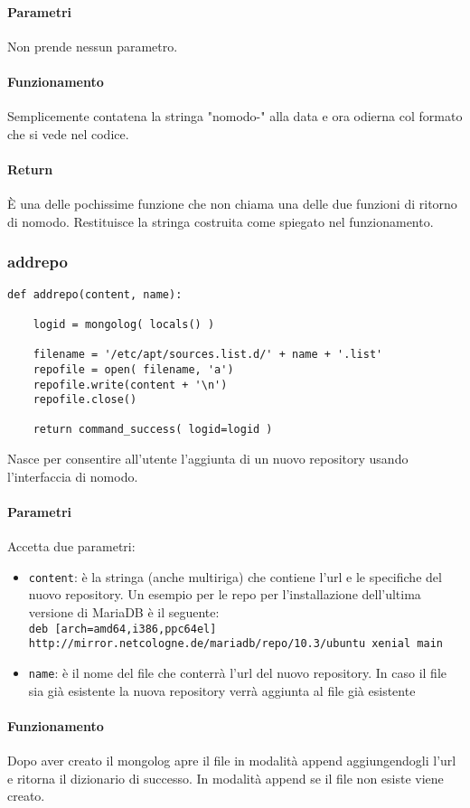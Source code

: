 \documentclass[11pt]{article}
\begin{document}
\paragraph{Parametri}
Non prende nessun parametro.
\paragraph{Funzionamento}
Semplicemente contatena la stringa "nomodo-" alla data e ora odierna col formato che si vede nel codice.
\paragraph{Return}
È una delle pochissime funzione che non chiama una delle due funzioni di ritorno di nomodo.
Restituisce la stringa costruita come spiegato nel funzionamento.

\subsubsection{addrepo}\label{addrepo}
\begin{lstlisting}
def addrepo(content, name):

    logid = mongolog( locals() )

    filename = '/etc/apt/sources.list.d/' + name + '.list'
    repofile = open( filename, 'a')
    repofile.write(content + '\n')
    repofile.close()

    return command_success( logid=logid )
\end{lstlisting}
Nasce per consentire all'utente l'aggiunta di un nuovo repository usando l'interfaccia di nomodo.
\paragraph{Parametri}
Accetta due parametri:
\begin{itemize}
	\item{\texttt{content}: è la stringa (anche multiriga) che contiene l'url e le specifiche del nuovo repository.
		Un esempio per le repo per l'installazione dell'ultima versione di MariaDB è il seguente:\\
		\texttt{deb [arch=amd64,i386,ppc64el] http://mirror.netcologne.de/mariadb/repo/10.3/ubuntu xenial main}}
	\item{\texttt{name}: è il nome del file che conterrà l'url del nuovo repository. In caso il file sia già esistente
		la nuova repository verrà aggiunta al file già esistente}
\end{itemize}
\paragraph{Funzionamento}
Dopo aver creato il mongolog apre il file in modalità append aggiungendogli l'url e ritorna il dizionario di successo.
In modalità append se il file non esiste viene creato.
\end{document}
